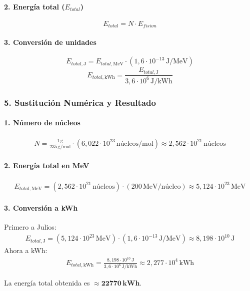 \paragraph*{2. Energía total ($E_{total}$)}
$$ E_{total} = N \cdot E_{fision} $$

\paragraph*{3. Conversión de unidades}
$$ E_{total, \text{J}} = E_{total, \text{MeV}} \cdot (1,6 \cdot 10^{-13}\,\text{J/MeV}) $$
$$ E_{total, \text{kWh}} = \frac{E_{total, \text{J}}}{3,6 \cdot 10^6\,\text{J/kWh}} $$

\subsubsection*{5. Sustitución Numérica y Resultado}
\paragraph*{1. Número de núcleos}
\begin{gather}
    N = \frac{1\,\text{g}}{235\,\text{g/mol}} \cdot (6,022\cdot10^{23}\,\text{núcleos/mol}) \approx 2,562 \cdot 10^{21}\,\text{núcleos}
\end{gather}

\paragraph*{2. Energía total en MeV}
\begin{gather}
    E_{total, \text{MeV}} = (2,562 \cdot 10^{21}\,\text{núcleos}) \cdot (200\,\text{MeV/núcleo}) \approx 5,124 \cdot 10^{23}\,\text{MeV}
\end{gather}

\paragraph*{3. Conversión a kWh}
Primero a Julios:
\begin{gather}
    E_{total, \text{J}} = (5,124 \cdot 10^{23}\,\text{MeV}) \cdot (1,6\cdot10^{-13}\,\text{J/MeV}) \approx 8,198 \cdot 10^{10}\,\text{J}
\end{gather}
Ahora a kWh:
\begin{gather}
    E_{total, \text{kWh}} = \frac{8,198 \cdot 10^{10}\,\text{J}}{3,6 \cdot 10^6\,\text{J/kWh}} \approx 2,277 \cdot 10^4\,\text{kWh}
\end{gather}
\begin{cajaresultado}
    La energía total obtenida es $\boldsymbol{\approx 22770\,\textbf{kWh}}$.
\end{cajaresultado}

